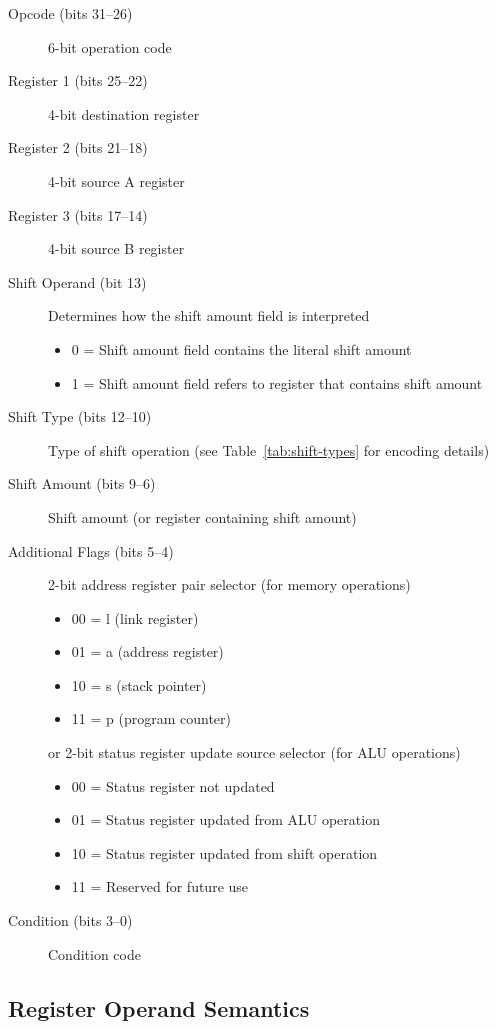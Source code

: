\begin{description}
	\item[Opcode (bits 31--26)] 6-bit operation code
	\item[Register 1 (bits 25--22)] 4-bit destination register
	\item[Register 2 (bits 21--18)] 4-bit source A register
	\item[Register 3 (bits 17--14)] 4-bit source B register
	\item[Shift Operand (bit 13)] Determines how the shift amount field is interpreted
	      \begin{itemize}
		      \item 0 = Shift amount field contains the literal shift amount
		      \item 1 = Shift amount field refers to register that contains shift amount
	      \end{itemize}
	\item[Shift Type (bits 12--10)] Type of shift operation (see Table~\ref{tab:shift-types} for encoding details)
	\item[Shift Amount (bits 9--6)] Shift amount (or register containing shift amount)
	\item[Additional Flags (bits 5--4)] 2-bit address register pair selector (for memory operations)
	      \begin{itemize}
		      \item 00 = l (link register)
		      \item 01 = a (address register)
		      \item 10 = s (stack pointer)
		      \item 11 = p (program counter)
	      \end{itemize}
	      or 2-bit status register update source selector (for ALU operations)
	      \begin{itemize}
		      \item 00 = Status register not updated
		      \item 01 = Status register updated from ALU operation
		      \item 10 = Status register updated from shift operation
		      \item 11 = Reserved for future use
	      \end{itemize}
	\item[Condition (bits 3--0)] Condition code
\end{description}

\subsection{Register Operand Semantics}


